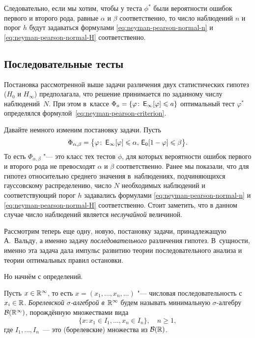 \begin{example}
	Следовательно, если мы хотим, чтобы у теста \(\phi^{*}\) были вероятности 
	ошибок первого и второго рода, равные \(\alpha\) и \(\beta\) 
	соответственно, то число наблюдений \(n\) и порог \(h\) будут задаваться 
	формулами \eqref{eq:neyman-pearson-normal-n} и 
	\eqref{eq:neyman-pearson-normal-H} соответственно.
\end{example}

\subsection{Последовательные тесты}

Постановка рассмотренной выше задачи различения двух статистических гипотез ($H_{0}$ и 
$H_{\infty}$) предполагала, что решение принимается по заданному числу наблюдений~$N$. При 
этом в~классе $\Phi_{a}=\left\{\varphi\colon \E_{\infty}[\phi] \leq a\right\}$ оптимальный тест 
$\varphi^*$ определялся формулой~\eqref{eq:neyman-pearson-criterion}.

Давайте немного изменим постановку задачи. Пусть
\begin{equation}
	\Phi_{\alpha,\beta} = \bigl\{\phi \colon \E_{\infty}[\phi] \leq \alpha,\,\E_{0}[1 - \phi] \leq 
	\beta\bigr\}.
\end{equation}
То есть \(\Phi_{\alpha, \beta}\) "--- это класс тех тестов $\phi$, для которых вероятности ошибок 
первого и второго рода не превосходят $\alpha$ и $\beta$ соответственно. Ранее мы показали, что для 
гипотез относительно среднего значения в~наблюдениях, подчиняющихся гауссовскому распределению, 
число \(N\) необходимых наблюдений и соответствующий порог \(h\) задавались формулами  
\eqref{eq:neyman-pearson-normal-n} и \eqref{eq:neyman-pearson-normal-H} соответственно. Стоит 
заметить, что в данном случае число наблюдений является \emph{неслучайной} величиной.

Рассмотрим теперь еще одну, новую, постановку задачи, принадлежащую А.~Вальду, а именно задачу
\emph{последовательного} различения гипотез. В~сущности, именно эта задача дала импульс развитию 
теории последовательного анализа и теории оптимальных правил остановки.

Но начнём с определений.
\begin{definition}
	Пусть \(x \in \mathbb{R}^{\infty}\), то есть \(x = (x_{1}, \ldots, x_{n}, \ldots)\) "--- числовая 
	последовательность с \(x_{i} \in \mathbb{R}\). \emph{Борелевской \(\sigma\)-алгеброй в \(\mathbb{R}^{\infty}\)} 
	будем называть минимальную \(\sigma\)-алгебру \(\mathcal{B}(\mathbb{R}^{\infty})\), порождённую множествами вида
	\begin{equation}
		\{x \colon x_{1} \in I_{1}, \ldots, x_{n} \in I_{n}\}, \quad n \geq 1,
	\end{equation}
	где \(I_{1}, \ldots, I_{n}\)~--- это (борелевские) множества из \(\mathcal{B}(\mathbb{R})\). 
\end{definition}

